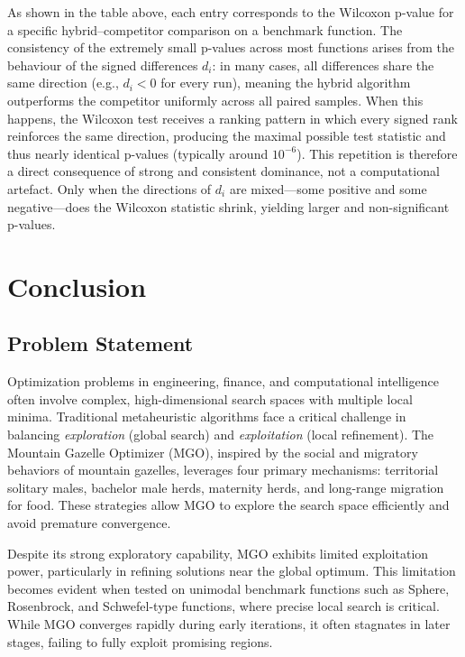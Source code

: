 \documentclass[12pt,a4paper]{article}
\begin{document}
As shown in the table above, each entry corresponds to the Wilcoxon p-value for a specific hybrid–competitor comparison on a benchmark function. The consistency of the extremely small p-values across most functions arises from the behaviour of the signed differences \(d_i\): in many cases, all differences share the same direction (e.g., \(d_i<0\) for every run), meaning the hybrid algorithm outperforms the competitor uniformly across all paired samples. When this happens, the Wilcoxon test receives a ranking pattern in which every signed rank reinforces the same direction, producing the maximal possible test statistic and thus nearly identical p-values (typically around \(10^{-6}\)). This repetition is therefore a direct consequence of strong and consistent dominance, not a computational artefact. Only when the directions of \(d_i\) are mixed—some positive and some negative—does the Wilcoxon statistic shrink, yielding larger and non-significant p-values.


\section{Conclusion}
\subsection{Problem Statement}

Optimization problems in engineering, finance, and computational intelligence often involve complex, high-dimensional search spaces with multiple local minima. Traditional metaheuristic algorithms face a critical challenge in balancing \textit{exploration} (global search) and \textit{exploitation} (local refinement). The Mountain Gazelle Optimizer (MGO), inspired by the social and migratory behaviors of mountain gazelles, leverages four primary mechanisms: territorial solitary males, bachelor male herds, maternity herds, and long-range migration for food. These strategies allow MGO to explore the search space efficiently and avoid premature convergence.

Despite its strong exploratory capability, MGO exhibits limited exploitation power, particularly in refining solutions near the global optimum. This limitation becomes evident when tested on unimodal benchmark functions such as Sphere, Rosenbrock, and Schwefel-type functions, where precise local search is critical. While MGO converges rapidly during early iterations, it often stagnates in later stages, failing to fully exploit promising regions.
\end{document}
